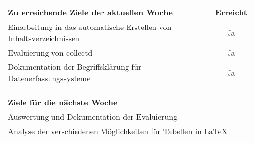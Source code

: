 \begin{tabularx}{\textwidth}{Xc}
    \arrayrulecolor{OliveGreen}
    \toprule
    {\bfseries Zu erreichende Ziele der aktuellen Woche} & {\bfseries Erreicht} \\
    \midrule[2pt]
    Einarbeitung in das automatische Erstellen von Inhaltsverzeichnissen &Ja    \\
    \rowcolor{OliveGreen!15}
    Evaluierung von collectd                             &Ja                    \\
    \rowcolor{White}
    Dokumentation der Begriffsklärung für Datenerfassungssysteme &Ja            \\
    \bottomrule[2pt]
\end{tabularx}
%
\vspace{1cm}
%
\begin{tabularx}{\textwidth}{Xc}
    \arrayrulecolor{OliveGreen}
    \toprule
    {\bfseries Ziele für die nächste Woche}              &                      \\
    \midrule[2pt]
    Auswertung und Dokumentation der Evaluierung &      \\
    \rowcolor{OliveGreen!15}
    Analyse der verschiedenen Möglichkeiten für Tabellen in \LaTeX{} &          \\
\end{tabularx}
